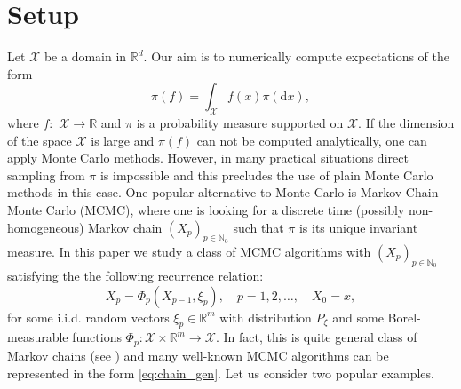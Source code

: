 \documentclass[bj]{imsart}
\def\nset{\mathbb{N}}
\def\rmd{\mathrm{d}}
\begin{document}
\section{Setup}\label{sec:setup}
Let  \(\mathcal{X}\) be a domain in \( \mathbb{R}^d.\)  Our aim is to numerically compute  expectations of the form
\[
\pi(f)=\int_{\mathcal{X}} f(x)\pi(\rmd x),
\]
where \(f:\) \(\mathcal{X}\longrightarrow \mathbb{R}\) and \(\pi\) is a probability measure supported on \(\mathcal{X}.\)
If  the dimension of the space \(\mathcal{X}\) is large and \(\pi(f)\) can not be computed analytically, one can apply Monte Carlo methods. However, in many practical situations  direct sampling from \(\pi\) is impossible and this precludes the use of plain Monte Carlo methods in this case. One popular alternative to Monte Carlo  is Markov Chain Monte Carlo (MCMC), where one is looking for a discrete time  (possibly non-homogeneous) Markov chain   \((X_p)_{p \in \nset_0}\) such that \(\pi\) is its unique invariant measure. In this paper we study a class of MCMC algorithms with \((X_p)_{p \in \nset_0}\) satisfying the  the following recurrence relation:
\begin{equation}
\label{eq:chain_gen}
X_{p}=\Phi_{p}(X_{p-1},\xi_{p}),\quad p=1,2,\ldots ,\quad X_{0}=x,
\end{equation}
for some i.i.d.  random vectors \(\xi_p\in \mathbb{R}^m\) with distribution \(P_{\xi}\)
and some Borel-measurable
functions $\Phi_{p}\colon\mathcal{X}\times\mathbb{R}^{m}\to\mathcal{X}.$
In fact, this is quite general class of Markov chains (see \cite[Theorem~1.3.6]{moulines2018})
and many well-known MCMC algorithms can be represented in the form \eqref{eq:chain_gen}.
Let us consider two popular examples.
\end{document}
